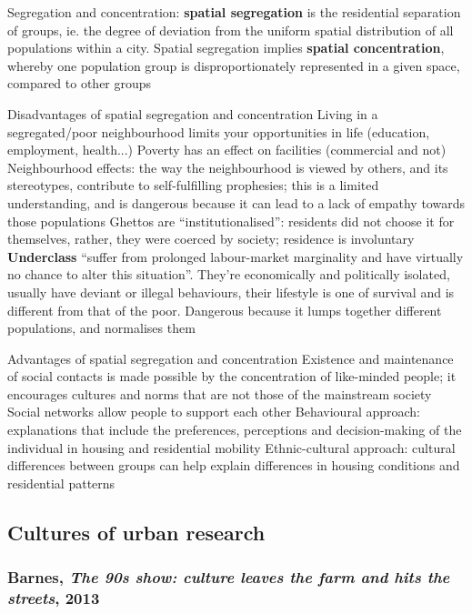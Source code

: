 \documentclass{article}
\begin{document}
\begin{outline}
	\1 Segregation and concentration: \textbf{spatial segregation} is the residential separation of groups, ie. the degree of deviation from the uniform spatial distribution of all populations within a city. Spatial segregation implies \textbf{spatial concentration}, whereby one population group is disproportionately represented in a given space, compared to other groups
		
	\1 Disadvantages of spatial segregation and concentration
		\2 Living in a segregated/poor neighbourhood limits your opportunities in life (education, employment, health...)
		\2 Poverty has an effect on facilities (commercial and not)
		\2 Neighbourhood effects: the way the neighbourhood is viewed by others, and its stereotypes, contribute to self-fulfilling prophesies; this is a limited understanding, and is dangerous because it can lead to a lack of empathy towards those populations
		\2 Ghettos are ``institutionalised'': residents did not choose it for themselves, rather, they were coerced by society; residence is involuntary
		\2 \textbf{Underclass} ``suffer from prolonged labour-market marginality and have virtually no chance to alter this situation''. They're economically and politically isolated, usually have deviant or illegal behaviours, their lifestyle is one of survival and is different from that of the poor. Dangerous because it lumps together different populations, and normalises them
		
	\1 Advantages of spatial segregation and concentration
		\2 Existence and maintenance of social contacts is made possible by the concentration of like-minded people; it encourages cultures and norms that are not those of the mainstream society
		\2 Social networks allow people to support each other
	\1 Behavioural approach: explanations that include the preferences, perceptions and decision-making of the individual in housing and residential mobility
	\1 Ethnic-cultural approach: cultural differences between groups can help explain differences in housing conditions and residential patterns

\end{outline}

\subsection{Cultures of urban research}

\subsubsection{Barnes, \textit{The 90s show: culture leaves the farm and hits the streets}, 2013}
\end{document}
